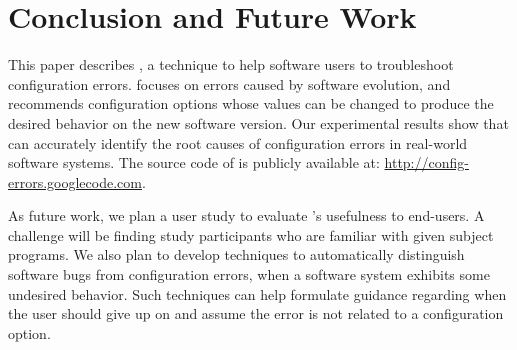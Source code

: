 \section{Conclusion and Future Work}
\label{sec:conclusion}


This paper describes \ourtool, a technique to help software
users to troubleshoot configuration errors. \ourtool
focuses on errors caused by software evolution, and
recommends configuration options whose values can be changed to
produce the desired behavior on the new software version.
Our experimental results show that \ourtool
can accurately identify the root causes of
\errornum configuration errors in \subjnum real-world software systems.
The source code of \ourtool is publicly available
at: \url{http://config-errors.googlecode.com}.

As future work, we plan a user study to evaluate
\ourtool's usefulness to end-users. A challenge
will be finding study participants who are familiar
with given subject programs.
We also plan to develop techniques to
automatically distinguish software bugs from 
configuration errors, when a software system exhibits
some undesired behavior.
Such techniques can help formulate guidance
regarding when the user should give up on \ourtool
and assume the error is not related to a configuration option.

